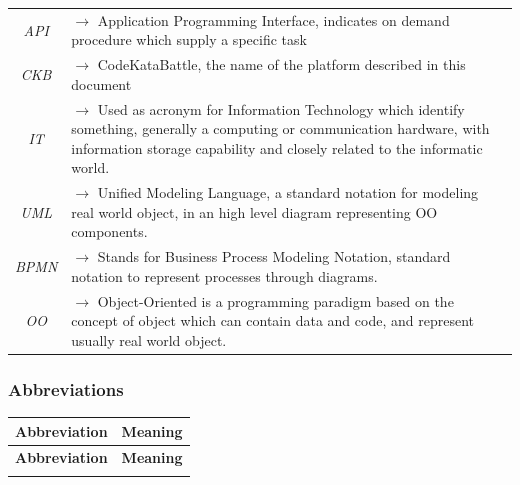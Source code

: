 \documentclass{article}
\begin{document}
{\begin{xltabular}{\textwidth}{ >{\raggedright\arraybackslash}c >{\raggedright\arraybackslash}X }
            \endhead
            \endfoot
            \endlastfoot

            \textit{API} & $\rightarrow$ Application Programming Interface, indicates on demand procedure which supply a specific task
            \\
            \textit{CKB} & $\rightarrow$ CodeKataBattle, the name of the platform described in this document
            \\
            \textit{IT} & $\rightarrow$ Used as acronym for Information Technology which identify something, generally a computing or communication hardware, with information storage capability and closely related to the informatic world.
            \\
            \textit{UML} & $\rightarrow$ Unified Modeling Language, a standard notation for modeling real world object, in an high level diagram representing OO components.
            \\
            \textit{BPMN} & $\rightarrow$ Stands for Business Process Modeling Notation, standard notation to represent processes through diagrams.  
            \\
            \textit{OO} & $\rightarrow$ Object-Oriented is a programming paradigm based on the concept of object which can contain data and code, and represent usually real world object.
            
        \end{xltabular}
        
        
    \subsubsection{Abbreviations}
       \begin{xltabular}{\textwidth}{ >{\raggedright\arraybackslash}c >{\raggedright\arraybackslash}X }
            \hline 
            \textbf{Abbreviation} & \textbf{Meaning} \\
            \hline 
                
            \endfirsthead

            \hline 
            \textbf{Abbreviation} & \textbf{Meaning} \\
            \hline 

            \endhead
            \endfoot
            \endlastfoot


\end{xltabular}}
\end{document}
